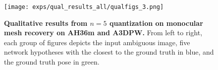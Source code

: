 \begin{figure}[t]
\centering
{\texttt{[image: exps/qual\_results\_all/qualfigs\_3.png]}}
\vspace{-1.15cm}
\caption{%
    \textbf{Qualitative results from $n=5$ quantization on monocular mesh recovery on AH36m and A3DPW.} 
    From left to right, each group of figures depicts the input ambiguous image, five network hypotheses with the closest to the ground truth in blue, and the ground truth pose in green.
    }\label{fig:qual_results_all}
\end{figure}